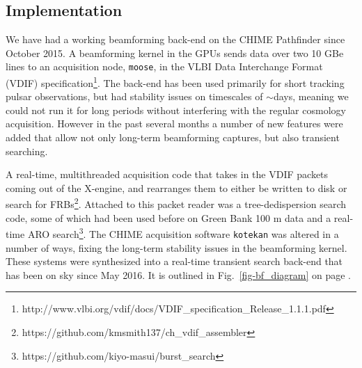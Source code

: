 \subsection{Implementation}

We have had a working beamforming back-end on the CHIME 
Pathfinder since October 2015. 
A beamforming kernel in the GPUs sends data over two 10 GBe
lines to an acquisition node, {\tt moose}, 
in the VLBI Data Interchange Format (VDIF) 
specification\footnote{http://www.vlbi.org/vdif/docs/VDIF\_specification\_Release\_1.1.1.pdf}. 
The back-end has been used primarily 
for short tracking pulsar observations, but had stability issues 
on timescales of $\sim$days, meaning we could not run it 
for long periods without interfering with the regular cosmology acquisition. 
However in the past several months a number of new features 
were added that allow not only long-term beamforming captures, 
but also transient searching. 
 
A real-time, multithreaded acquisition code that takes in the VDIF 
packets coming out of the X-engine, and rearranges them to either be written to disk or search for 
FRBs\footnote{https://github.com/kmsmith137/ch\_vdif\_assembler}. Attached 
to this packet reader was a tree-dedispersion search code, some of 
which had been used before on Green Bank 100 m data and a real-time ARO 
search\footnote{https://github.com/kiyo-masui/burst\_search}.
The CHIME acquisition software {\tt kotekan} was 
altered in a number of ways, fixing the long-term 
stability issues in the beamforming kernel. These systems 
were synthesized into a real-time transient search back-end 
that has been on sky since May 2016. 
It is outlined in Fig.~\ref{fig-bf_diagram}
on page \pageref{fig-bf_diagram}. 


